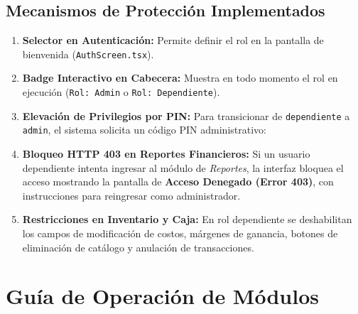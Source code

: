 \documentclass[12pt,a4paper]{article}
\begin{document}
\subsection{Mecanismos de Protección Implementados}
\begin{enumerate}
    \item \textbf{Selector en Autenticación:} Permite definir el rol en la pantalla de bienvenida (\texttt{AuthScreen.tsx}).
    \item \textbf{Badge Interactivo en Cabecera:} Muestra en todo momento el rol en ejecución (\texttt{Rol: Admin} o \texttt{Rol: Dependiente}).
    \item \textbf{Elevación de Privilegios por PIN:} Para transicionar de \texttt{dependiente} a \texttt{admin}, el sistema solicita un código PIN administrativo:
    \begin{center}
    \end{center}
    \item \textbf{Bloqueo HTTP 403 en Reportes Financieros:} Si un usuario dependiente intenta ingresar al módulo de \textit{Reportes}, la interfaz bloquea el acceso mostrando la pantalla de \textbf{Acceso Denegado (Error 403)}, con instrucciones para reingresar como administrador.
    \item \textbf{Restricciones en Inventario y Caja:} En rol dependiente se deshabilitan los campos de modificación de costos, márgenes de ganancia, botones de eliminación de catálogo y anulación de transacciones.
\end{enumerate}

\section{Guía de Operación de Módulos}
\end{document}
